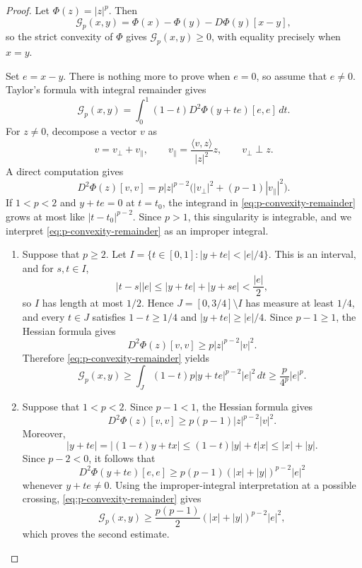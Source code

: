 \documentclass[12pt]{amsart}
\theoremstyle{definition}
\numberwithin{equation}{section}
\newcommand{\mc}{\mathcal}
\begin{document}
\begin{proof}
Let \(\Phi(z)=|z|^p\).  Then
\[
  \mc G_p(x,y)
  =\Phi(x)-\Phi(y)-D\Phi(y)[x-y],
\]
so the strict convexity of \(\Phi\) gives
\(\mc G_p(x,y)\geq0\), with equality precisely when \(x=y\).

Set \(e=x-y\).  There is nothing more to prove when \(e=0\), so assume
that \(e\neq0\).  Taylor's formula with integral remainder gives
\begin{equation}\label{eq:p-convexity-remainder}
  \mc G_p(x,y)
  =\int_0^1(1-t)
    D^2\Phi(y+te)[e,e]\,dt.
\end{equation}
For \(z\neq0\), decompose a vector \(v\) as
\[
  v=v_\perp+v_\parallel,
  \qquad
  v_\parallel=\frac{\langle v,z\rangle}{|z|^2}z,
  \qquad
  v_\perp\perp z.
\]
A direct computation gives
\[
  D^2\Phi(z)[v,v]
  =p|z|^{p-2}
    \bigl(|v_\perp|^2+(p-1)|v_\parallel|^2\bigr).
\]
If \(1<p<2\) and \(y+te=0\) at \(t=t_0\), the integrand in
\eqref{eq:p-convexity-remainder} grows at most like
\(|t-t_0|^{p-2}\).  Since \(p>1\), this singularity is integrable, and
we interpret \eqref{eq:p-convexity-remainder} as an improper integral.

\begin{enumerate}[label=\textup{(\roman*)}]
\item Suppose that \(p\geq2\).  Let
\(I=\{t\in[0,1]:|y+te|<|e|/4\}\).  This is an interval, and for
\(s,t\in I\),
\[
  |t-s||e|
  \leq |y+te|+|y+se|
  <\frac{|e|}{2},
\]
so \(I\) has length at most \(1/2\).  Hence
\(J=[0,3/4]\setminus I\) has measure at least \(1/4\), and every
\(t\in J\) satisfies \(1-t\geq1/4\) and
\(|y+te|\geq|e|/4\).
Since \(p-1\geq1\), the Hessian formula gives
\[
  D^2\Phi(z)[v,v]\geq p|z|^{p-2}|v|^2.
\]
Therefore \eqref{eq:p-convexity-remainder} yields
\[
  \mc G_p(x,y)
  \geq \int_J(1-t)p|y+te|^{p-2}|e|^2\,dt
  \geq \frac{p}{4^p}|e|^p.
\]

\item Suppose that \(1<p<2\).  Since \(p-1<1\), the Hessian formula
gives
\[
  D^2\Phi(z)[v,v]\geq p(p-1)|z|^{p-2}|v|^2.
\]
Moreover,
\[
  |y+te|
  =|(1-t)y+tx|
  \leq(1-t)|y|+t|x|
  \leq|x|+|y|.
\]
Since \(p-2<0\), it follows that
\[
  D^2\Phi(y+te)[e,e]
  \geq p(p-1)(|x|+|y|)^{p-2}|e|^2
\]
whenever \(y+te\neq0\).  Using the improper-integral interpretation at
a possible crossing, \eqref{eq:p-convexity-remainder} gives
\[
  \mc G_p(x,y)
  \geq\frac{p(p-1)}{2}(|x|+|y|)^{p-2}|e|^2,
\]
which proves the second estimate.
\end{enumerate}
\end{proof}
\end{document}
